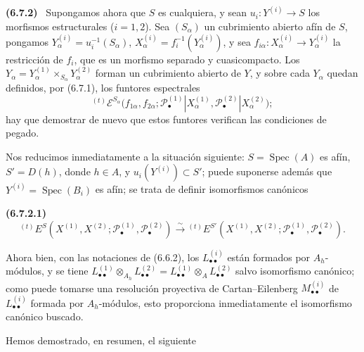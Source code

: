 \documentclass[10pt,oneside]{book}
\newenvironment{env}[1][]{\par\medskip\noindent\textbf{(#1)}\ }{\par}
\begin{document}
\begin{env}[6.7.2]
\label{III.6.7.2}
Supongamos ahora que $S$ es cualquiera, y sean
$u_i:Y^{(i)}\to S$ los morfismos estructurales ($i=1,2$). Sea $(S_\alpha)$ un
cubrimiento abierto afín de $S$, pongamos
$Y_\alpha^{(i)}=u_i^{-1}(S_\alpha)$,
$X_\alpha^{(i)}=f_i^{-1}(Y_\alpha^{(i)})$, y sea
$f_{i\alpha}:X_\alpha^{(i)}\to Y_\alpha^{(i)}$ la restricción de $f_i$, que
es un morfismo separado y cuasicompacto. Los
$Y_\alpha=Y_\alpha^{(1)}\times_{S_\alpha}Y_\alpha^{(2)}$ forman un
cubrimiento abierto de $Y$, y sobre cada $Y_\alpha$ quedan definidos, por
(6.7.1), los funtores espectrales
\[
  {}^{(t)}\mathscr E^{S_\alpha}
  \bigl(f_{1\alpha},f_{2\alpha};
    \mathscr P_\bullet^{(1)}|X_\alpha^{(1)},
    \mathscr P_\bullet^{(2)}|X_\alpha^{(2)}\bigr);
\]
hay que demostrar de nuevo que estos funtores verifican las condiciones de
pegado.

Nos reducimos inmediatamente a la situación siguiente:
$S=\operatorname{Spec}(A)$ es afín, $S'=D(h)$, donde $h\in A$, y
$u_i(Y^{(i)})\subset S'$; puede suponerse además que
$Y^{(i)}=\operatorname{Spec}(B_i)$ es afín; se trata de definir isomorfismos
canónicos
\begin{env}[6.7.2.1]
\label{III.6.7.2.1}
\[
  {}^{(t)}E^S
  (X^{(1)},X^{(2)};
   \mathscr P_\bullet^{(1)},\mathscr P_\bullet^{(2)})
  \xrightarrow{\sim}
  {}^{(t)}E^{S'}
  (X^{(1)},X^{(2)};
   \mathscr P_\bullet^{(1)},\mathscr P_\bullet^{(2)}).
  \tag{6.7.2.1}\label{III.6.7.2.1.eq}
\]
\end{env}
Ahora bien, con las notaciones de (6.6.2), los
$L_{\bullet\bullet}^{(i)}$ están formados por $A_h$-módulos, y se tiene
$L_{\bullet\bullet}^{(1)}\otimes_{A_h}L_{\bullet\bullet}^{(2)}
=L_{\bullet\bullet}^{(1)}\otimes_A L_{\bullet\bullet}^{(2)}$ salvo
isomorfismo canónico; como puede tomarse una resolución proyectiva de
Cartan--Eilenberg $M_{\bullet\bullet}^{(i)}$ de
$L_{\bullet\bullet}^{(i)}$ formada por $A_h$-módulos, esto proporciona
inmediatamente el isomorfismo canónico buscado.
\end{env}

Hemos demostrado, en resumen, el siguiente
\end{document}
